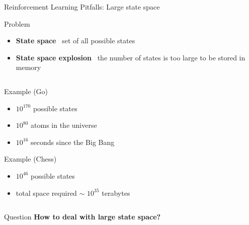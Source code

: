 \documentclass[presentation, 9pt]{beamer}\mode<presentation>{\usetheme{AMSBolognaFC}}
\begin{document}
\begin{frame}{Reinforcement Learning Pitfalls: Large state space}
\begin{block}{Problem}
	\begin{itemize}
		\item \textbf{State space} \faArrowRight \, set of all possible states
		\item \textbf{State space explosion} \faArrowRight \, the number of states is too large to be stored in memory
	\end{itemize}
\end{block}
\begin{columns}
	\begin{column}{0.5\textwidth}
		
			\begin{block}{Example (Go) \, \href{}{\faLink}}
				\begin{itemize}
					\item $10^{170}$ possible states \bold{(!!!!)}
					\item $10^{80}$ atoms in the universe
					\item $10^{16}$ seconds since the Big Bang
				\end{itemize}
			\end{block}
			\begin{block}{Example (Chess) \, \href{}{\faLink}}
				\begin{itemize}
					\item $10^{46}$ possible states
					\item total space required $\sim$ $10^{35}$ terabytes
				\end{itemize}
			\end{block}
	\end{column}
	\begin{column}{0.5\textwidth}
	\centering
	\end{column}
\end{columns}

\begin{alertblock}{Question}
	\centering
	\textbf{How to deal with large state space?}
\end{alertblock}
\end{frame}
\end{document}

